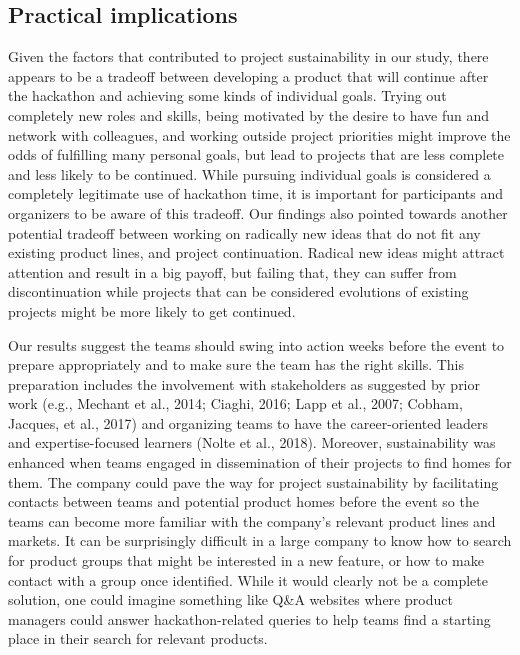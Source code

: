 \documentclass{hcij}
\begin{document}
\subsection{Practical implications}
Given the factors that contributed to project sustainability in our study, there appears to be a tradeoff between developing a product that will continue after the hackathon and achieving some kinds of individual goals. Trying out completely new roles and skills, being motivated by the desire to have fun and network with colleagues, and working outside project priorities might improve the odds of fulfilling many personal goals, but lead to projects that are less complete and less likely to be continued. While pursuing individual goals is considered a completely legitimate use of hackathon time, it is important for participants and organizers to be aware of this tradeoff. Our findings also pointed towards another potential tradeoff between working on radically new ideas that do not fit any existing product lines, and project continuation. Radical new ideas might attract attention and result in a big payoff, but failing that, they can suffer from discontinuation while projects that can be considered evolutions of existing projects might be more likely to get continued.

Our results suggest the teams should swing into action weeks before the event to prepare appropriately and to make sure the team has the right skills. This preparation includes the involvement with stakeholders as suggested by prior work (e.g., Mechant et al., 2014; Ciaghi, 2016; Lapp et al., 2007; Cobham, Jacques, et al., 2017) and organizing teams to have the career-oriented leaders and expertise-focused learners (Nolte et al., 2018). Moreover, sustainability was enhanced when teams engaged in dissemination of their projects to find homes for them. The company could pave the way for project sustainability by facilitating contacts between teams and potential product homes before the event so the teams can become more familiar with the company’s relevant product lines and markets. It can be surprisingly difficult in a large company to know how to search for product groups that might be interested in a new feature, or how to make contact with a group once identified. While it would clearly not be a complete solution, one could imagine something like Q&A websites where product managers could answer hackathon-related queries to help teams find a starting place in their search for relevant products.
\end{document}
